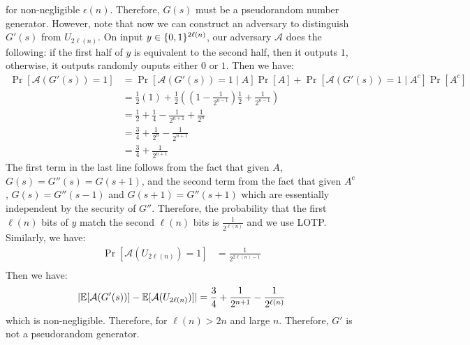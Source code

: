 \documentclass{article}
\begin{document}
\begin{enumerate}
\begin{enumerate}[noitemsep,topsep=\mdcompacttopsep,label=\alph*.]
for non-negligible $\epsilon(n)$. Therefore, $G(s)$ must be a pseudorandom number generator. 
However, note that now we can construct an adversary to distinguish $G'(s)$ from $U_{2 \ell(n)}$.
On input $y \in \{0,1\}^{2\ell(n)}$, our adversary $\mathcal{A}$ does the following: if the first half
of $y$ is equivalent to the second half, then it outputs $1$, otherwise, it outputs randomly ouputs either $0$ or $1$. Then
we have:
\noindent\noindent\[%
\begin{aligned}
\Pr[\mathcal{A}(G'(s)) = 1] &= \Pr[\mathcal{A}(G'(s)) = 1 \mid A] \Pr[A] + \Pr[\mathcal{A}(G'(s)) = 1 \mid A^c] \Pr[A^c] \\
&=  \frac{1}{2}(1) + \frac{1}{2}((1- \frac{1}{2^{n-1}})\frac{1}{2} + \frac{1}{2^{n-1}}) \\
&= \frac{1}{2} + \frac{1}{4} - \frac{1}{2^{n+1}} + \frac{1}{2^n}\\
&= \frac{3}{4} + \frac{1}{2^n} - \frac{1}{2^{n+1}} \\
&= \frac{3}{4} + \frac{1}{2^{n+1}}
\end{aligned}
\]%
The first term in the last line follows from the fact that given $A$, $G(s) = G''(s) = G(s + 1)$,
and the second term from the fact that given $A^c$, $G(s) = G''(s-1)$ and $G(s+1) = G''(s+1)$ which
are essentially independent by the security of $G''$. Therefore, the probability that the first
$\ell(n)$ bits of $y$ match the second $\ell(n)$ bits is $\frac{1}{2^{\ell(n)}}$ and we use LOTP.
Similarly, we have:
\noindent\noindent\[%
\begin{aligned}
 \Pr[\mathcal{A}(U_{2\ell(n)}) = 1] &= \frac{1}{2^{2\ell(n) - 1}} \\
\end{aligned} 
\]%
Then we have:
\noindent\noindent\[%
|\E[\mathcal{A}(G'(s))] - \E[\mathcal{A}(U_{2\ell(n)})]| = \frac{3}{4} + \frac{1}{2^{n+1}} - \frac{1}{2^{\ell(n)}} 
\]%
which is non-negligible. Therefore, for $\ell(n) > 2n$ and large $n$. Therefore, $G'$ is not a
pseudorandom generator.%
\end{enumerate}%


\end{enumerate}
\end{document}
